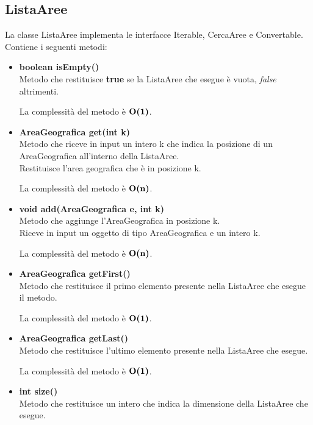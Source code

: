 \documentclass[a4paper, 12pt]{scrreprt}
\begin{document}
			\subsection{ListaAree}
			La classe ListaAree implementa le interfacce Iterable, CercaAree e Convertable. Contiene i seguenti metodi:
			\begin{itemize}
				\item \textbf{boolean isEmpty()}
				\\Metodo che restituisce \textbf{true} se la ListaAree che esegue \`e vuota, \textit{false} altrimenti.
				
				La complessit\`a del metodo \`e $\mathbf{O}\textbf{(1)}$.
				
				\item \textbf{AreaGeografica get(int k)}
				\\Metodo che riceve in input un intero k che indica la posizione di un AreaGeografica all'interno della ListaAree.
				\\Restituisce l'area geografica che \`e in posizione k.
				
				La complessit\`a del metodo \`e $\mathbf{O}\textbf{(n)}$.
				
				\item \textbf{void add(AreaGeografica e, int k)}
				\\Metodo che aggiunge l'AreaGeografica in posizione k.
				\\Riceve in input un oggetto di tipo AreaGeografica e un intero k.
				
				La complessit\`a del metodo \`e $\mathbf{O}\textbf{(n)}$.
				
				\item \textbf{AreaGeografica getFirst()}
				\\Metodo che restituisce il primo elemento presente nella ListaAree che esegue il metodo.
				
				La complessit\`a del metodo \`e $\mathbf{O}\textbf{(1)}$.
				
				\item \textbf{AreaGeografica getLast()}
				\\Metodo che restituisce l'ultimo elemento presente nella ListaAree che esegue.
				
				La complessit\`a del metodo \`e $\mathbf{O}\textbf{(1)}$.
				
				\item \textbf{int size()}
				\\Metodo che restituisce un intero che indica la dimensione della ListaAree che esegue.
				

\end{itemize}
\end{document}
